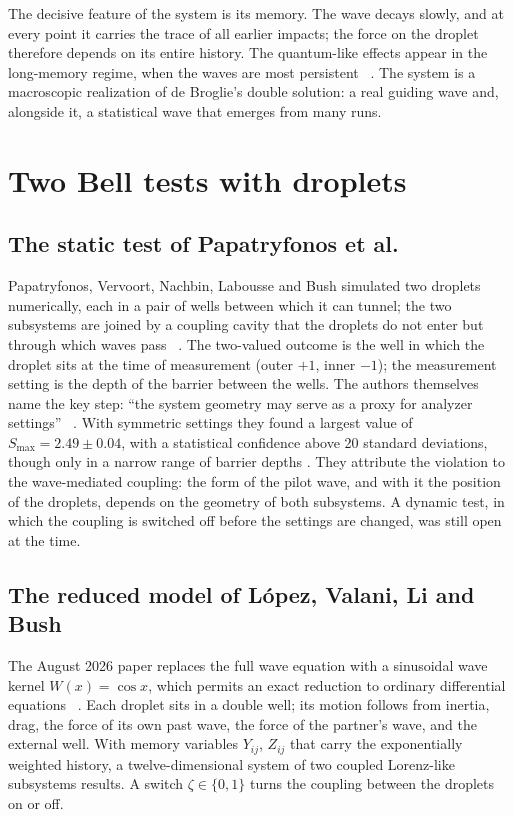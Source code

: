 The decisive feature of the system is its memory. The wave decays slowly, and at every point it
carries the trace of all earlier impacts; the force on the droplet therefore depends on its entire
history. The quantum-like effects appear in the long-memory regime, when the waves are most
persistent \QM~\cite{Lopez2026}. The system is a macroscopic realization of de Broglie's double
solution: a real guiding wave and, alongside it, a statistical wave that emerges from many runs.

\section{Two Bell tests with droplets}

\subsection{The static test of Papatryfonos et al.}

Papatryfonos, Vervoort, Nachbin, Labousse and Bush simulated two droplets numerically, each in a pair
of wells between which it can tunnel; the two subsystems are joined by a coupling cavity that the
droplets do not enter but through which waves pass \QM~\cite{Papatryfonos2023}. The two-valued
outcome is the well in which the droplet sits at the time of measurement (outer $+1$, inner $-1$);
the measurement setting is the depth of the barrier between the wells. The authors themselves name
the key step: \enquote{the system geometry may serve as a proxy for analyzer settings}
\QM~\cite{Papatryfonos2023}. With symmetric settings they found a largest value of
$S_{\max}=2.49\pm0.04$, with a statistical confidence above 20 standard deviations, though only in a
narrow range of barrier depths \QM. They attribute the violation to the wave-mediated coupling: the
form of the pilot wave, and with it the position of the droplets, depends on the geometry of both
subsystems. A dynamic test, in which the coupling is switched off before the settings are changed,
was still open at the time.

\subsection{The reduced model of López, Valani, Li and Bush}

The August 2026 paper replaces the full wave equation with a sinusoidal wave kernel $W(x)=\cos x$,
which permits an exact reduction to ordinary differential equations \QM~\cite{Lopez2026}. Each droplet
sits in a double well; its motion follows from inertia, drag, the force of its own past wave, the
force of the partner's wave, and the external well. With memory variables $Y_{ij}$, $Z_{ij}$ that
carry the exponentially weighted history, a twelve-dimensional system of two coupled Lorenz-like
subsystems results. A switch $\zeta\in\{0,1\}$ turns the coupling between the droplets on or off.

